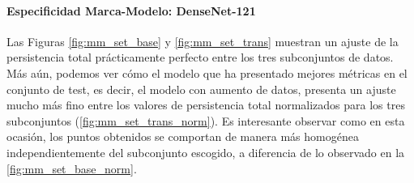 \paragraph{Especificidad Marca-Modelo: DenseNet-121}

Las Figuras \ref{fig:mm_set_base} y \ref{fig:mm_set_trans} muestran un ajuste de la persistencia total prácticamente perfecto entre los tres subconjuntos de datos. Más aún, podemos ver cómo el modelo que ha presentado mejores métricas en el conjunto de test, es decir, el modelo con aumento de datos, presenta un ajuste mucho más fino entre los valores de persistencia total normalizados para los tres subconjuntos (\autoref{fig:mm_set_trans_norm}). Es interesante observar como en esta ocasión, los puntos obtenidos se comportan de manera más homogénea independientemente del subconjunto escogido, a diferencia de lo observado en la \autoref{fig:mm_set_base_norm}.

